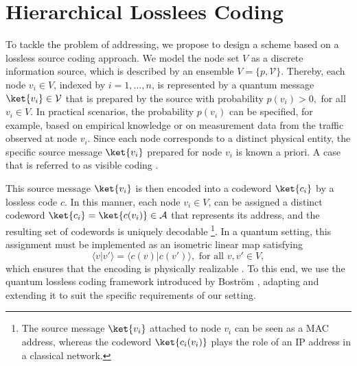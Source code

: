 \documentclass[conference]{IEEEtran}
\begin{document}
\section{Hierarchical Losslees Coding}\label{coding scheme section}
    To tackle the problem of addressing, we propose to design a scheme based on a lossless source coding approach. We model the node set $V$ as a discrete information source, which is described by an ensemble $V =\{p, \mathcal{V}\}$. Thereby, each node $v_i \in V$, indexed by \(i = 1, \dots, n\), is represented by a quantum message $\ket{v_i}\in \mathcal{V}$ that is prepared by the source with probability \(p(v_i)>0,\) for all $v_i \in V$. In practical scenarios, the probability \(p(v_i)\) can be specified, for example, based on empirical knowledge or on measurement data from the traffic observed at node \(v_i\). Since each node corresponds to a distinct physical entity, the specific source message $\ket{v_i}$ prepared for node $v_i$ is known a priori. A case that is referred to as visible coding \cite{HowardBarnum_2001}.

This source message $\ket{v_i}$ is then encoded into a codeword $\ket{c_i}$ by a lossless code $c$.
In this manner, each node \(v_i \in V\), can be assigned a distinct codeword $\ket{c_i}=\ket{c(v_i)} \in \mathcal{A}$ that represents its address, and the resulting set of codewords is uniquely decodable \footnote{The source message $\ket{v_i}$ attached to node $v_i$ can be seen as a MAC address, whereas the codeword $\ket{c_i(v_i)}$ plays the role of an IP address in a classical network.}. In a quantum setting, this assignment must be implemented as an isometric linear map satisfying
\begin{equation}
    \langle v|v'\rangle= \langle c(v)| c(v')\rangle, \text{ for all } v, v' \in V,
\end{equation}
which ensures that the encoding is physically realizable \cite{Nielsen_Chuang_2010, Wilde_2017}. To this end, we use the quantum lossless coding framework introduced by Boström \cite{PhysRevA.65.032313}, adapting and extending it to suit the specific requirements of our setting.
\end{document}
